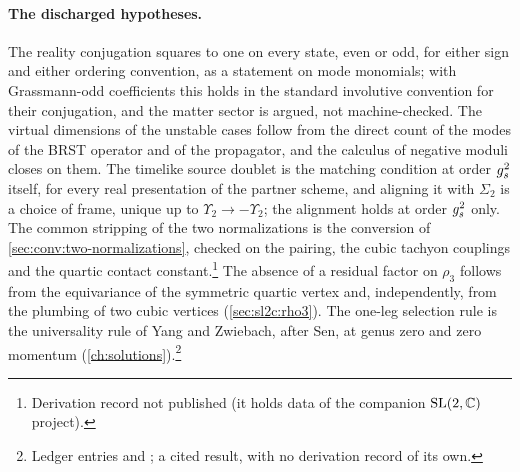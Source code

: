 \paragraph{The discharged hypotheses.}
The reality conjugation squares to one on every state, even or odd, for either sign and either ordering convention, as a statement on mode monomials; with Grassmann-odd coefficients this holds in the standard involutive convention for their conjugation, and the matter sector is argued, not machine-checked.
The virtual dimensions of the unstable cases follow from the direct count of the modes of the BRST operator and of the propagator, and the calculus of negative moduli closes on them.
The timelike source doublet is the matching condition at order $g_s^2$ itself, for every real presentation of the partner scheme, and aligning it with $\Sigma_2$ is a choice of frame, unique up to $\Upsilon_2 \to - \Upsilon_2$; the alignment holds at order $g_s^2$ only.
The common stripping of the two normalizations is the conversion of \cref{sec:conv:two-normalizations}, checked on the pairing, the cubic tachyon couplings and the quartic contact constant.\footnote{Derivation record not published (it holds data of the companion $\mathrm{SL}(2, \mathbb{C})$ project).}
The absence of a residual factor on $\rho_3$ follows from the equivariance of the symmetric quartic vertex and, independently, from the plumbing of two cubic vertices (\cref{sec:sl2c:rho3}).
The one-leg selection rule is the universality rule of Yang and Zwiebach, after Sen, at genus zero and zero momentum (\cref{ch:solutions}).\footnote{Ledger entries  and ; a cited result, with no derivation record of its own.}
